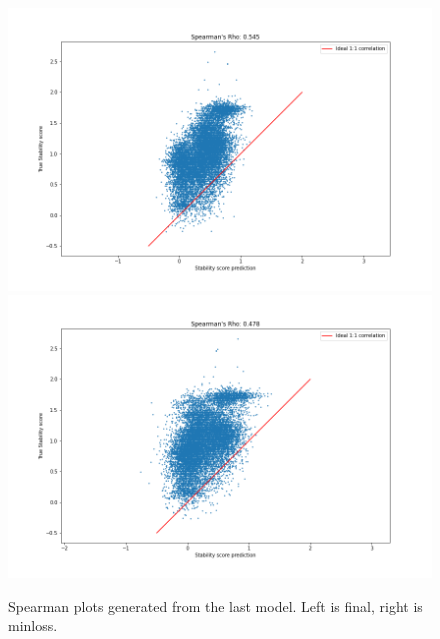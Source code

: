 \begin{figure}[!ht]
  \centering
  \includegraphics[width=0.49\linewidth]{latex/imgs/finished_spearman_final.png}
  \includegraphics[width=0.49\linewidth]{latex/imgs/finished_spearman_minloss.png}
  \caption{Spearman plots generated from the last model. Left is final, right is minloss.}
  \label{fig:finished_spearman}
\end{figure}